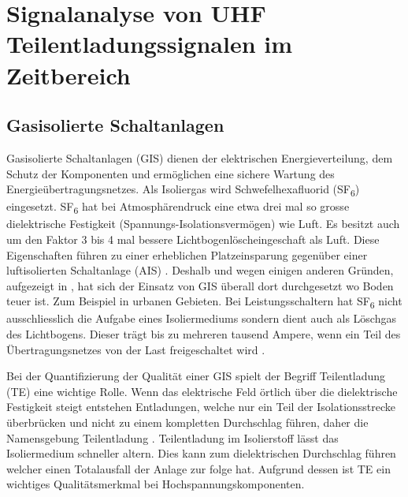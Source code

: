 %
%
%
\chapter{Signalanalyse von UHF Teilentladungssignalen im Zeitbereich \label{chapter:gis}}
\begin{refsection}

\section{Gasisolierte Schaltanlagen}

Gasisolierte Schaltanlagen (GIS) dienen der elektrischen Energieverteilung, dem Schutz der Komponenten und ermöglichen eine sichere Wartung des Energieübertragungsnetzes.
Als Isoliergas wird Schwefelhexafluorid (SF\textsubscript{6}) eingesetzt. SF\textsubscript{6} hat bei Atmosphärendruck eine etwa drei mal so grosse dielektrische Festigkeit (Spannungs-Isolationsvermögen) wie Luft. 
Es besitzt auch um den Faktor 3 bis 4 mal bessere Lichtbogenlöscheingeschaft als Luft. 
Diese Eigenschaften führen zu einer erheblichen Platzeinsparung gegenüber einer luftisolierten Schaltanlage (AIS) \cite{buch:ABB}.
Deshalb und wegen einigen anderen Gründen, aufgezeigt in \cite{buch:GIS/AIS}, hat sich der Einsatz von GIS überall dort durchgesetzt wo Boden teuer ist. Zum Beispiel in urbanen Gebieten. 
Bei Leistungsschaltern hat SF\textsubscript{6} nicht ausschliesslich die Aufgabe eines Isoliermediums sondern dient auch als Löschgas des Lichtbogens.
Dieser trägt bis zu mehreren tausend Ampere, wenn ein Teil des Übertragungsnetzes von der Last freigeschaltet  wird \cite{buch:ABB}.

Bei der Quantifizierung der Qualität einer GIS spielt der Begriff Teilentladung (TE) eine wichtige Rolle. 
Wenn das elektrische Feld örtlich über die dielektrische Festigkeit steigt entstehen Entladungen, welche nur ein Teil der Isolationsstrecke überbrücken und nicht zu einem kompletten Durchschlag führen, daher die Namensgebung Teilentladung \cite{buch:Kuchler}.
Teilentladung im Isolierstoff lässt das Isoliermedium  schneller altern. Dies kann zum dielektrischen Durchschlag führen welcher einen Totalausfall der Anlage zur folge hat.
Aufgrund dessen ist TE ein wichtiges Qualitätsmerkmal bei Hochspannungskomponenten. 


\end{refsection}
